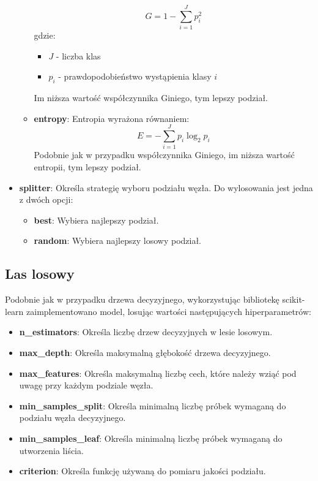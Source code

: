 \documentclass{article}
\begin{document}
\begin{itemize}
\begin{itemize}
        \begin{equation}
            G = 1 - \sum_{i=1}^{J}p_i^2
        \end{equation}
        gdzie: 
        \begin{itemize}
            \item $J$ - liczba klas
            \item $p_i$ - prawdopodobieństwo wystąpienia klasy $i$
        \end{itemize}
        Im niższa wartość współczynnika Giniego, tym lepszy podział.
        \item \textbf{entropy}: Entropia wyrażona równaniem:
        \begin{equation}
            E = -\sum_{i=1}^{J}p_i\log_2{p_i}
        \end{equation}
        Podobnie jak w przypadku współczynnika Giniego, im niższa
        wartość entropii, tym lepszy podział.
    \end{itemize}
    \item \textbf{splitter}: Określa strategię 
    wyboru podziału węzła. Do wylosowania jest
    jedna z dwóch opcji:
    \begin{itemize}
        \item \textbf{best}: Wybiera najlepszy podział.
        \item \textbf{random}: Wybiera najlepszy losowy podział.
    \end{itemize}

\end{itemize}

\subsection{Las losowy}

Podobnie jak w przypadku drzewa decyzyjnego, wykorzystując bibliotekę
scikit-learn zaimplementowano model, losując wartości
następujących hiperparametrów:

\begin{itemize}
    \item \textbf{n\_estimators}: Określa liczbę drzew decyzyjnych
    w lesie losowym.
    \item \textbf{max\_depth}: Określa maksymalną głębokość drzewa
    decyzyjnego.
    \item \textbf{max\_features}: Określa maksymalną liczbę cech,
    które należy wziąć pod uwagę przy każdym podziale węzła.
    \item \textbf{min\_samples\_split}: Określa minimalną liczbę
    próbek wymaganą do podziału węzła decyzyjnego.
    \item \textbf{min\_samples\_leaf}: Określa minimalną liczbę
    próbek wymaganą do utworzenia liścia.
    \item \textbf{criterion}: Określa funkcję używaną do pomiaru
    jakości podziału.
\end{itemize}
\end{document}
